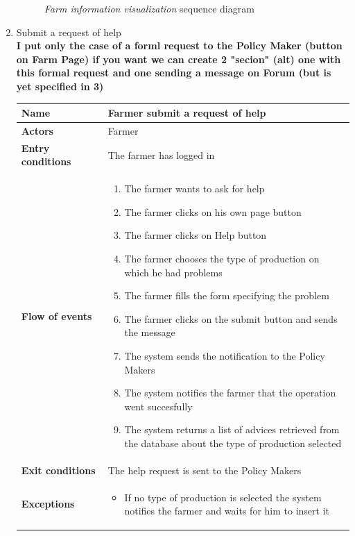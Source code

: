 \begin{enumerate}
\begin{figure}[H]
\begin{center}
        \caption{\emph{Farm information visualization} sequence diagram}
        \label{fig:sequence5}
        \end{center}
    \end{figure}

    \item Submit a request of help\\
    \textbf{I put only the case of a forml request to the Policy Maker (button on Farm Page) if you want we can create 2 "secion" (alt) one with this formal request and one sending a message on Forum (but is yet specified in 3)}
    \begin{longtable}{p{0.26\linewidth}p{0.75\linewidth}}
        \toprule
        \textbf{Name} & \textbf{Farmer submit a request of help} \\
        \midrule
        \textbf{Actors} & Farmer \\
        \midrule
        \textbf{Entry conditions} & The farmer has logged in\\
        \midrule
        \textbf{Flow of events} & 
        \begin{enumerate}
            \item The farmer wants to ask for help
            \item The farmer clicks on his own page button
            \item The farmer clicks on Help button
            \item The farmer chooses the type of production on which he had problems
            \item The farmer fills the form specifying the problem
            \item The farmer clicks on the submit button and sends the message
            \item The system sends the notification to the Policy Makers
            \item The system notifies the farmer that the operation went succesfully
            \item The system returns a list of advices retrieved from the database about the type of production selected
        \end{enumerate} \\
        \midrule
        \textbf{Exit conditions} & The help request is sent to the Policy Makers\\
        \midrule
        \textbf{Exceptions} & 
        \begin{itemize}
            \item If no type of production is selected the system notifies the farmer and waits for him to insert it

\end{itemize}
\end{longtable}
\end{enumerate}
